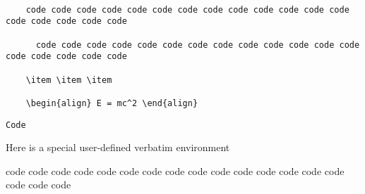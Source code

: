\documentclass{article}
\begin{document}
    \begin{verbatim}

    code code code code code code code code code code code code code code code code code code

      code code code code code code code code code code code code code code code code code code

    \item \item \item

    \begin{align} E = mc^2 \end{align}

    \end{verbatim}

\begin{lstlisting}[caption={A very long and complicated caption that does not fit into one line}]
  Code
\end{lstlisting}

Here is a special user-defined verbatim environment

\begin{myverbatim}
    code code code code code code code code code code code code code code code code code code
\end{myverbatim}
\end{document}
